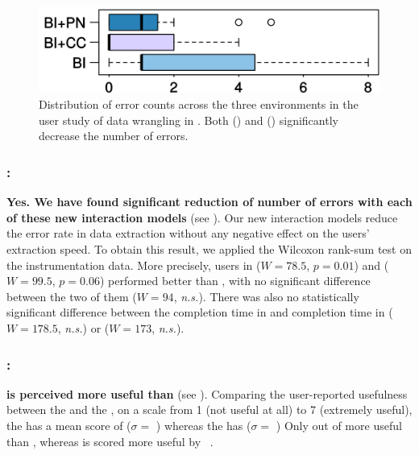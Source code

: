 \begin{figure}[t]
    \centering
    \includegraphics[width=0.6\columnwidth]{figures/error-plot1}
    \uwsinglespace
    \caption{Distribution of error counts across the three environments in the user study of data wrangling in
        \FlashProg.
        Both \ConversationalClarification{} (\ConversationalClarificationInitials) and
        \ProgramNavigation{} (\ProgramNavigationInitials) significantly decrease the number of errors.}
    \label{fig:interactive:study:errorcounts}
\end{figure}

\subsubsection*{\RQOneShort: \RQOne}
\textbf{Yes. We have found significant
reduction of number of errors with each of these new interaction models} (see ).
Our new interaction models reduce the error rate in data extraction without any
negative effect on the users' extraction speed. To obtain this result, we applied the
Wilcoxon rank-sum test on the instrumentation data.
More precisely, users in \BIDT ($W=78.5$, $p=0.01$) and \BIPW ($W= 99.5$, $p=0.06$)
performed better than \BI, with no significant
difference between the two of them ($W=94$, \textit{n.s.}).
There was also no statistically significant difference between the completion time in \BI and
completion time in \BIDT ($W=178.5$, \textit{n.s.}) or \BIPW{} ($W=173$, \textit{n.s.}).

\subsubsection*{\RQTwoShort: \RQTwo}
\textbf{\ConversationalClarification is perceived more useful than \ProgramNavigation} (see
).
Comparing the user-reported usefulness between the \ConversationalClarification and the \ProgramNavigation, on a
scale from 1 (not useful at all) to 7 (extremely useful), the
\ConversationalClarification has a mean score of \usefulnessDisambiguation{} ($\sigma =$
\usefulnessDisambiguationStdDev{})
whereas the \ProgramNavigation has \usefulnessProgramViewer{} ($\sigma =$ \usefulnessProgramViewerStdDev{})
Only  out of
\numPeopleSurvey{}
 \ProgramNavigation more useful than
\ConversationalClarification,
whereas \ConversationalClarification is scored more useful by
\numUserPreferringDisambiguation~.

